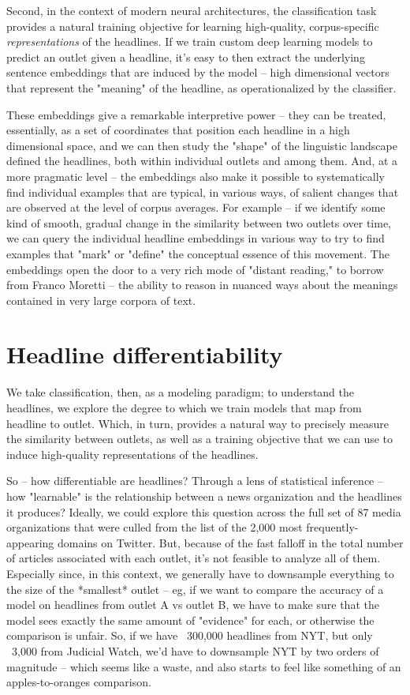 \documentclass{scrartcl}
\begin{document}
Second, in the context of modern neural architectures, the classification task provides a natural training objective for learning high-quality, corpus-specific \textit{representations} of the headlines. If we train custom deep learning models to predict an outlet given a headline, it's easy to then extract the underlying sentence embeddings that are induced by the model -- high dimensional vectors that represent the "meaning" of the headline, as operationalized by the classifier.

These embeddings give a remarkable interpretive power -- they can be treated, essentially, as a set of coordinates that position each headline in a high dimensional space, and we can then study the "shape" of the linguistic landscape defined the headlines, both within individual outlets and among them. And, at a more pragmatic level -- the embeddings also make it possible to systematically find individual examples that are typical, in various ways, of salient changes that are observed at the level of corpus averages. For example -- if we identify some kind of smooth, gradual change in the similarity between two outlets over time, we can query the individual headline embeddings in various way to try to find examples that "mark" or "define" the conceptual essence of this movement. The embeddings open the door to a very rich mode of "distant reading," to borrow from Franco Moretti -- the ability to reason in nuanced ways about the meanings contained in very large corpora of text.

\section{Headline differentiability}

We take classification, then, as a modeling paradigm; to understand the headlines, we explore the degree to which we train models that map from headline to outlet. Which, in turn, provides a natural way to precisely measure the similarity between outlets, as well as a training objective that we can use to induce high-quality representations of the headlines.

So -- how differentiable are headlines? Through a lens of statistical inference -- how "learnable" is the relationship between a news organization and the headlines it produces? Ideally, we could explore this question across the full set of 87 media organizations that were culled from the list of the 2,000 most frequently-appearing domains on Twitter. But, because of the fast falloff in the total number of articles associated with each outlet, it's not feasible to analyze all of them. Especially since, in this context, we generally have to downsample everything to the size of the *smallest* outlet -- eg, if we want to compare the accuracy of a model on headlines from outlet A vs outlet B, we have to make sure that the model sees exactly the same amount of "evidence" for each, or otherwise the comparison is unfair. So, if we have ~300,000 headlines from NYT, but only ~3,000 from Judicial Watch, we'd have to downsample NYT by two orders of magnitude -- which seems like a waste, and also starts to feel like something of an apples-to-oranges comparison.
\end{document}
